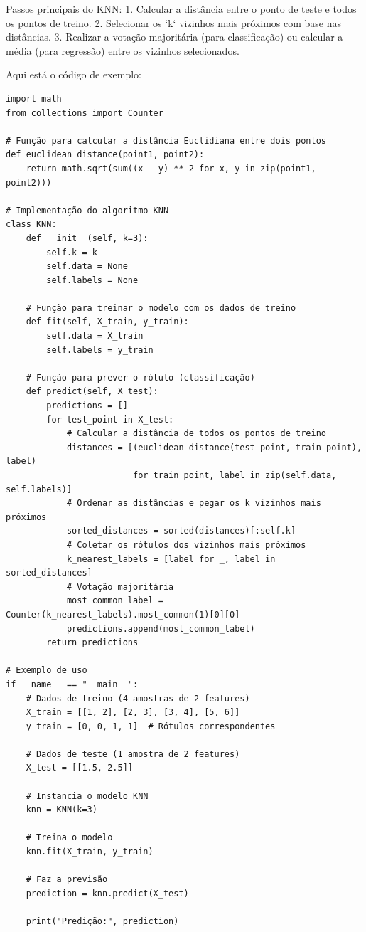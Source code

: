 \documentclass[12pt]{article}
\begin{document}
Passos principais do KNN:
1. Calcular a distância entre o ponto de teste e todos os pontos de treino.
2. Selecionar os `k` vizinhos mais próximos com base nas distâncias.
3. Realizar a votação majoritária (para classificação) ou calcular a média (para regressão) entre os vizinhos selecionados.

Aqui está o código de exemplo:

\begin{verbatim}
import math
from collections import Counter

# Função para calcular a distância Euclidiana entre dois pontos
def euclidean_distance(point1, point2):
    return math.sqrt(sum((x - y) ** 2 for x, y in zip(point1, point2)))

# Implementação do algoritmo KNN
class KNN:
    def __init__(self, k=3):
        self.k = k
        self.data = None
        self.labels = None

    # Função para treinar o modelo com os dados de treino
    def fit(self, X_train, y_train):
        self.data = X_train
        self.labels = y_train

    # Função para prever o rótulo (classificação)
    def predict(self, X_test):
        predictions = []
        for test_point in X_test:
            # Calcular a distância de todos os pontos de treino
            distances = [(euclidean_distance(test_point, train_point), label)
                         for train_point, label in zip(self.data, self.labels)]
            # Ordenar as distâncias e pegar os k vizinhos mais próximos
            sorted_distances = sorted(distances)[:self.k]
            # Coletar os rótulos dos vizinhos mais próximos
            k_nearest_labels = [label for _, label in sorted_distances]
            # Votação majoritária
            most_common_label = Counter(k_nearest_labels).most_common(1)[0][0]
            predictions.append(most_common_label)
        return predictions

# Exemplo de uso
if __name__ == "__main__":
    # Dados de treino (4 amostras de 2 features)
    X_train = [[1, 2], [2, 3], [3, 4], [5, 6]]
    y_train = [0, 0, 1, 1]  # Rótulos correspondentes

    # Dados de teste (1 amostra de 2 features)
    X_test = [[1.5, 2.5]]

    # Instancia o modelo KNN
    knn = KNN(k=3)
    
    # Treina o modelo
    knn.fit(X_train, y_train)
    
    # Faz a previsão
    prediction = knn.predict(X_test)
    
    print("Predição:", prediction)
    
\end{verbatim}
\end{document}
